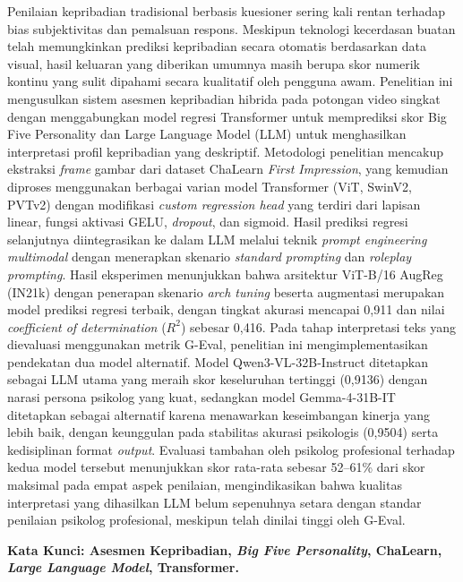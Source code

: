 Penilaian kepribadian tradisional berbasis kuesioner sering kali rentan terhadap bias subjektivitas dan pemalsuan respons. Meskipun teknologi kecerdasan buatan telah memungkinkan prediksi kepribadian secara otomatis berdasarkan data visual, hasil keluaran yang diberikan umumnya masih berupa skor numerik kontinu yang sulit dipahami secara kualitatif oleh pengguna awam. Penelitian ini mengusulkan sistem asesmen kepribadian hibrida pada potongan video singkat dengan menggabungkan model regresi Transformer untuk memprediksi skor Big Five Personality dan Large Language Model (LLM) untuk menghasilkan interpretasi profil kepribadian yang deskriptif. Metodologi penelitian mencakup ekstraksi \textit{frame} gambar dari dataset ChaLearn \textit{First Impression}, yang kemudian diproses menggunakan berbagai varian model Transformer (ViT, SwinV2, PVTv2) dengan modifikasi \textit{custom regression head} yang terdiri dari lapisan linear, fungsi aktivasi GELU, \textit{dropout}, dan sigmoid. Hasil prediksi regresi selanjutnya diintegrasikan ke dalam LLM melalui teknik \textit{ prompt engineering multimodal} dengan menerapkan skenario \textit{standard prompting} dan \textit{roleplay prompting}. Hasil eksperimen menunjukkan bahwa arsitektur ViT-B/16 AugReg (IN21k) dengan penerapan skenario \textit{arch tuning} beserta augmentasi merupakan model prediksi regresi terbaik, dengan tingkat akurasi mencapai 0,911 dan nilai \textit{coefficient of determination} ($R^2$) sebesar 0,416. Pada tahap interpretasi teks yang dievaluasi menggunakan metrik G-Eval, penelitian ini mengimplementasikan pendekatan dua model alternatif. Model Qwen3-VL-32B-Instruct ditetapkan sebagai LLM utama yang meraih skor keseluruhan tertinggi (0,9136) dengan narasi persona psikolog yang kuat, sedangkan model Gemma-4-31B-IT ditetapkan sebagai alternatif karena menawarkan keseimbangan kinerja yang lebih baik, dengan keunggulan pada stabilitas akurasi psikologis (0,9504) serta kedisiplinan format \textit{output}. Evaluasi tambahan oleh psikolog profesional terhadap kedua model tersebut menunjukkan skor rata-rata sebesar 52–61\% dari skor maksimal pada empat aspek penilaian, mengindikasikan bahwa kualitas interpretasi yang dihasilkan LLM belum sepenuhnya setara dengan standar penilaian psikolog profesional, meskipun telah dinilai tinggi oleh G-Eval.

\noindent
\textbf{Kata Kunci: Asesmen Kepribadian, \textit{Big Five Personality}, ChaLearn, \textit{Large Language Model}, Transformer.}
